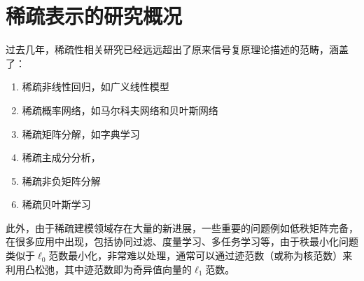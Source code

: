 \section{稀疏表示的研究概况}

过去几年，稀疏性相关研究已经远远超出了原来信号复原理论描述的范畴，涵盖了：
\begin{enumerate}
	\item 稀疏非线性回归，如广义线性模型
	\item 稀疏概率网络，如马尔科夫网络和贝叶斯网络
	\item 稀疏矩阵分解，如字典学习
	\item 稀疏主成分分析，
	\item 稀疏非负矩阵分解
	\item 稀疏贝叶斯学习
\end{enumerate}


此外，由于稀疏建模领域存在大量的新进展，一些重要的问题例如低秩矩阵完备，在很多应用中出现，包括协同过滤、度量学习、多任务学习等，由于秩最小化问题类似于$ \ell_0 $范数最小化，非常难以处理，通常可以通过迹范数（或称为核范数）来利用凸松弛，其中迹范数即为奇异值向量的$ \ell_1 $范数。


